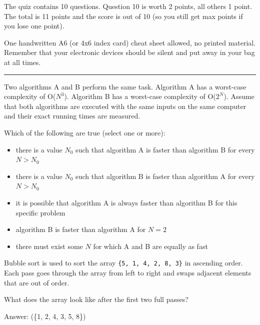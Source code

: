 \fullname

The quiz contains 10 questions. Question 10 is worth 2 points, all others 1 point. The total is 11 points and the score is out of 10 (so you still get max points if you lose one point).

One handwritten A6 (or 4x6 index card) cheat sheet allowed, no printed material.
Remember that your electronic devices should be silent and put away in your bag at all times.

\bigskip
\begin{center}\rule{0.4\linewidth}{0.4pt}\end{center}
\bigskip

\begin{question}
Two algorithms A and B perform the same task. Algorithm A has a worst-case complexity
of O($N^3$). Algorithm B has a worst-case complexity of O($2^N$).
Assume that both algorithms are executed with the same inputs on the same computer and their exact running times are measured.

Which of the following are true (select one or more):
\begin{itemize}[leftmargin=2em,itemsep=1pt,topsep=2pt]
\item[\cb{1}] there is a value $N_0$ such that algorithm A is faster than algorithm B for every $N>N_0$
\item[\cb{0}] there is a value $N_0$ such that algorithm B is faster than algorithm A for every $N>N_0$
\item[\cb{1}] it is possible that algorithm A is always faster than algorithm B for this specific problem
\item[\cb{0}] algorithm B is faster than algorithm A for $N=2$
\item[\cb{0}] there must exist some $N$ for which A and B are equally as fast
\end{itemize}
\end{question}

\begin{question}
Bubble sort is used to sort the array \lstinline|{5, 1, 4, 2, 8, 3}| in ascending order.
Each pass goes through the array from left to right and swaps adjacent elements that are out of order.

What does the array look like after the first two full passes?

Answer: \underline{\hspace{2in}} \ifanswers (\{1, 2, 4, 3, 5, 8\})\fi
\end{question}

